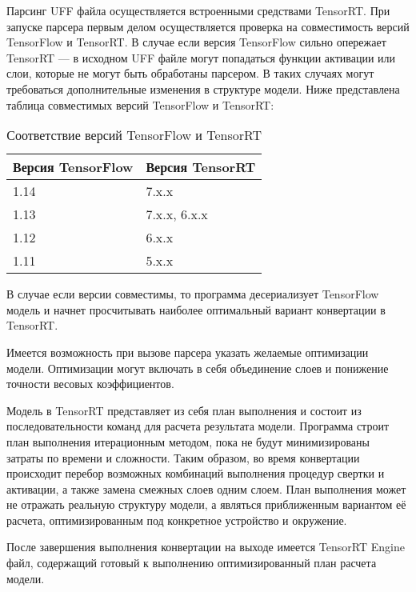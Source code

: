 Парсинг UFF файла осуществляется встроенными средствами TensorRT. При запуске парсера первым делом осуществляется проверка на совместимость версий TensorFlow и TensorRT. В случае если версия TensorFlow сильно опережает TensorRT — в исходном UFF файле могут попадаться функции активации или слои, которые не могут быть обработаны парсером. В таких случаях могут требоваться дополнительные изменения в структуре модели. Ниже представлена таблица совместимых версий TensorFlow и TensorRT:

\begin{table}[H]
	\caption{Соответствие версий TensorFlow и TensorRT}
	\begin{center}
		\begin{tabular}{|l|l|}
			\hline
			Версия TensorFlow & Версия TensorRT\\ \hline
			1.14 & 7.x.x\\ \hline
			1.13 & 7.x.x, 6.x.x\\ \hline
			1.12 & 6.x.x\\ \hline
			1.11 & 5.x.x\\ \hline
		\end{tabular}
		\label{tabular:tab_examp}
	\end{center}
\end{table}

В случае если версии совместимы, то программа десериализует TensorFlow модель и начнет просчитывать наиболее оптимальный вариант конвертации в TensorRT. 

Имеется возможность при вызове парсера указать желаемые оптимизации модели. Оптимизации могут включать в себя объединение слоев и понижение точности весовых коэффициентов. 

Модель в TensorRT представляет из себя план выполнения и состоит из последовательности команд для расчета результата модели. Программа строит план выполнения итерационным методом, пока не будут минимизированы затраты по времени и сложности. Таким образом, во время конвертации происходит перебор возможных комбинаций выполнения процедур свертки и активации, а также замена смежных слоев одним слоем. План выполнения может не отражать реальную структуру модели, а являться приближенным вариантом её расчета, оптимизированным под конкретное устройство и окружение. 

После завершения выполнения конвертации на выходе имеется TensorRT Engine файл, содержащий готовый к выполнению оптимизированный план расчета модели.


